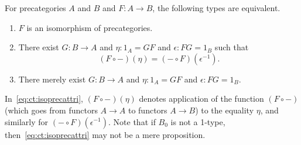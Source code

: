 \documentclass{amsart}
\newcommand{\opp}[1]{\mathord{{#1}^{-1}}}
\newcommand{\map}[2]{\ensuremath{{#1}\left({#2}\right)}\xspace}
\theoremstyle{definition}
\theoremstyle{remark}
\numberwithin{equation}{section}
\begin{document}
\begin{lem}\label{ct:isoprecat}
  For precategories $A$ and $B$ and $F:A\to B$, the following types are equivalent.
  \begin{enumerate}
  \item $F$ is an isomorphism of precategories.\label{item:ct:ipc1}
  \item There exist $G:B\to A$ and $\eta:1_A = GF$ and $\epsilon:FG=1_B$ such that\label{item:ct:ipc2}
    \begin{equation}
      \map{(F\circ -)}{\eta} = \map{(-\circ F)}{\opp\epsilon}.\label{eq:ct:isoprecattri}
    \end{equation}
  \item There merely exist $G:B\to A$ and $\eta:1_A = GF$ and $\epsilon:FG=1_B$.\label{item:ct:ipc3}
  \end{enumerate}
\end{lem}

In~\eqref{eq:ct:isoprecattri}, $\map{(F\circ -)}{\eta}$ denotes application of the function $(F\circ -)$ (which goes from functors $A\to A$ to functors $A\to B$) to the equality $\eta$, and similarly for $\map{(-\circ F)}{\opp\epsilon}$.
Note that if $B_0$ is not a 1-type, then~\eqref{eq:ct:isoprecattri} may not be a mere proposition.
\end{document}
